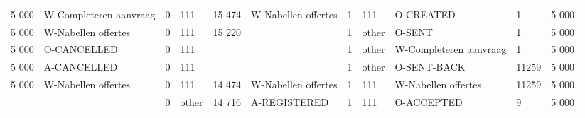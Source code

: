 \begin{tabular}{llllllllllr}
5 000 & W-Completeren aanvraag & 0 & 111 & 15 474 & W-Nabellen offertes & 1 & 111 & O-CREATED & 1 & 5 000 \\
5 000 & W-Nabellen offertes & 0 & 111 & 15 220 &  & 1 & other & O-SENT & 1 & 5 000 \\
5 000 & O-CANCELLED & 0 & 111 &  &  & 1 & other & W-Completeren aanvraag & 1 & 5 000 \\
5 000 & A-CANCELLED & 0 & 111 &  &  & 1 & other & O-SENT-BACK & 11259 & 5 000 \\
5 000 & W-Nabellen offertes & 0 & 111 & 14 474 & W-Nabellen offertes & 1 & 111 & W-Nabellen offertes & 11259 & 5 000 \\
 &  & 0 & other & 14 716 & A-REGISTERED & 1 & 111 & O-ACCEPTED & 9 & 5 000 \\
\bottomrule
\end{tabular}
